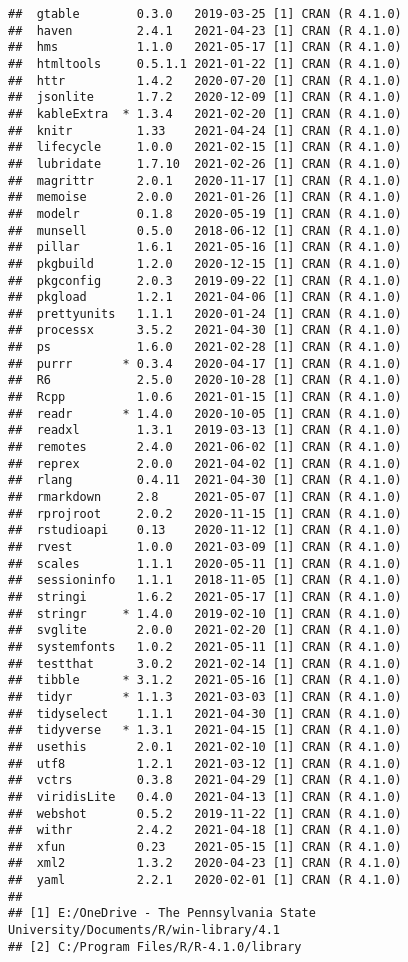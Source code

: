 \documentclass[
  letterpaper,
  openany]{book}
\begin{document}
\begin{verbatim}
##  gtable        0.3.0   2019-03-25 [1] CRAN (R 4.1.0)
##  haven         2.4.1   2021-04-23 [1] CRAN (R 4.1.0)
##  hms           1.1.0   2021-05-17 [1] CRAN (R 4.1.0)
##  htmltools     0.5.1.1 2021-01-22 [1] CRAN (R 4.1.0)
##  httr          1.4.2   2020-07-20 [1] CRAN (R 4.1.0)
##  jsonlite      1.7.2   2020-12-09 [1] CRAN (R 4.1.0)
##  kableExtra  * 1.3.4   2021-02-20 [1] CRAN (R 4.1.0)
##  knitr         1.33    2021-04-24 [1] CRAN (R 4.1.0)
##  lifecycle     1.0.0   2021-02-15 [1] CRAN (R 4.1.0)
##  lubridate     1.7.10  2021-02-26 [1] CRAN (R 4.1.0)
##  magrittr      2.0.1   2020-11-17 [1] CRAN (R 4.1.0)
##  memoise       2.0.0   2021-01-26 [1] CRAN (R 4.1.0)
##  modelr        0.1.8   2020-05-19 [1] CRAN (R 4.1.0)
##  munsell       0.5.0   2018-06-12 [1] CRAN (R 4.1.0)
##  pillar        1.6.1   2021-05-16 [1] CRAN (R 4.1.0)
##  pkgbuild      1.2.0   2020-12-15 [1] CRAN (R 4.1.0)
##  pkgconfig     2.0.3   2019-09-22 [1] CRAN (R 4.1.0)
##  pkgload       1.2.1   2021-04-06 [1] CRAN (R 4.1.0)
##  prettyunits   1.1.1   2020-01-24 [1] CRAN (R 4.1.0)
##  processx      3.5.2   2021-04-30 [1] CRAN (R 4.1.0)
##  ps            1.6.0   2021-02-28 [1] CRAN (R 4.1.0)
##  purrr       * 0.3.4   2020-04-17 [1] CRAN (R 4.1.0)
##  R6            2.5.0   2020-10-28 [1] CRAN (R 4.1.0)
##  Rcpp          1.0.6   2021-01-15 [1] CRAN (R 4.1.0)
##  readr       * 1.4.0   2020-10-05 [1] CRAN (R 4.1.0)
##  readxl        1.3.1   2019-03-13 [1] CRAN (R 4.1.0)
##  remotes       2.4.0   2021-06-02 [1] CRAN (R 4.1.0)
##  reprex        2.0.0   2021-04-02 [1] CRAN (R 4.1.0)
##  rlang         0.4.11  2021-04-30 [1] CRAN (R 4.1.0)
##  rmarkdown     2.8     2021-05-07 [1] CRAN (R 4.1.0)
##  rprojroot     2.0.2   2020-11-15 [1] CRAN (R 4.1.0)
##  rstudioapi    0.13    2020-11-12 [1] CRAN (R 4.1.0)
##  rvest         1.0.0   2021-03-09 [1] CRAN (R 4.1.0)
##  scales        1.1.1   2020-05-11 [1] CRAN (R 4.1.0)
##  sessioninfo   1.1.1   2018-11-05 [1] CRAN (R 4.1.0)
##  stringi       1.6.2   2021-05-17 [1] CRAN (R 4.1.0)
##  stringr     * 1.4.0   2019-02-10 [1] CRAN (R 4.1.0)
##  svglite       2.0.0   2021-02-20 [1] CRAN (R 4.1.0)
##  systemfonts   1.0.2   2021-05-11 [1] CRAN (R 4.1.0)
##  testthat      3.0.2   2021-02-14 [1] CRAN (R 4.1.0)
##  tibble      * 3.1.2   2021-05-16 [1] CRAN (R 4.1.0)
##  tidyr       * 1.1.3   2021-03-03 [1] CRAN (R 4.1.0)
##  tidyselect    1.1.1   2021-04-30 [1] CRAN (R 4.1.0)
##  tidyverse   * 1.3.1   2021-04-15 [1] CRAN (R 4.1.0)
##  usethis       2.0.1   2021-02-10 [1] CRAN (R 4.1.0)
##  utf8          1.2.1   2021-03-12 [1] CRAN (R 4.1.0)
##  vctrs         0.3.8   2021-04-29 [1] CRAN (R 4.1.0)
##  viridisLite   0.4.0   2021-04-13 [1] CRAN (R 4.1.0)
##  webshot       0.5.2   2019-11-22 [1] CRAN (R 4.1.0)
##  withr         2.4.2   2021-04-18 [1] CRAN (R 4.1.0)
##  xfun          0.23    2021-05-15 [1] CRAN (R 4.1.0)
##  xml2          1.3.2   2020-04-23 [1] CRAN (R 4.1.0)
##  yaml          2.2.1   2020-02-01 [1] CRAN (R 4.1.0)
## 
## [1] E:/OneDrive - The Pennsylvania State University/Documents/R/win-library/4.1
## [2] C:/Program Files/R/R-4.1.0/library
\end{verbatim}
\end{document}
